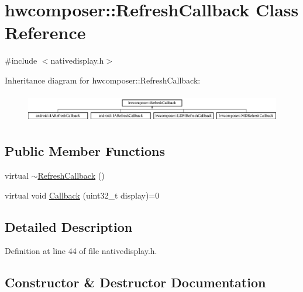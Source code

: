 \hypertarget{classhwcomposer_1_1RefreshCallback}{}\section{hwcomposer\+:\+:Refresh\+Callback Class Reference}
\label{classhwcomposer_1_1RefreshCallback}


{\ttfamily \#include $<$nativedisplay.\+h$>$}

Inheritance diagram for hwcomposer\+:\+:Refresh\+Callback\+:\begin{figure}[H]
\begin{center}
\leavevmode
\includegraphics[height=1.290323cm]{classhwcomposer_1_1RefreshCallback}
\end{center}
\end{figure}
\subsection*{Public Member Functions}
\begin{DoxyCompactItemize}
\item 
virtual \mbox{\hyperlink{classhwcomposer_1_1RefreshCallback_a49bc1e202d559138f6839a3a592be721}{$\sim$\+Refresh\+Callback}} ()
\item 
virtual void \mbox{\hyperlink{classhwcomposer_1_1RefreshCallback_a5637a4b1437bbf8c93d8356addbf7c87}{Callback}} (uint32\+\_\+t display)=0
\end{DoxyCompactItemize}


\subsection{Detailed Description}


Definition at line 44 of file nativedisplay.\+h.



\subsection{Constructor \& Destructor Documentation}
\mbox{\label{classhwcomposer_1_1RefreshCallback_a49bc1e202d559138f6839a3a592be721}} 
